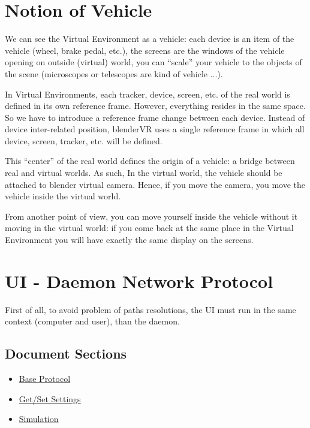 \documentclass[a4,10pt,openany,oneside]{sphinxmanual}
\begin{document}
\section{Notion of  Vehicle}
\label{architecture/vehicle:notion-of-vehicle}\label{architecture/vehicle::doc}
We can see the Virtual Environment as a vehicle: each device is an item of the vehicle (wheel, brake pedal, etc.), the screens are the windows of the vehicle opening on outside (virtual) world, you can ``scale'' your vehicle to the objects of the scene (microscopes or telescopes are kind of vehicle ...).

In Virtual Environments, each tracker, device, screen, etc. of the real world is defined in its own reference frame. However, everything resides in the same space. So we have to introduce a reference frame change between each device. Instead of device inter-related position, blenderVR uses a single reference frame in which all device, screen, tracker, etc. will be defined.

This ``center'' of the real world defines the origin of a vehicle: a bridge between real and virtual worlds.
As such, In the virtual world, the vehicle should be attached to blender virtual camera. Hence, if you move the camera, you move the vehicle inside the virtual world.

From another point of view, you can move yourself inside the vehicle without it moving in the virtual world: if you come back at the same place in the Virtual Environment you will have exactly the same display on the screens.


\section{UI - Daemon Network Protocol}
\label{architecture/protocols:ui-daemon-network-protocol}\label{architecture/protocols::doc}
First of all, to avoid problem of paths resolutions, the UI must run in the same context (computer and user), than the daemon.


\subsection{Document Sections}
\label{architecture/protocols:document-sections}\begin{itemize}
\item {} 
{\hyperref[architecture/protocols:base-protocol]{Base Protocol}}

\item {} 
{\hyperref[architecture/protocols:get-set-settings]{Get/Set Settings}}

\item {} 
{\hyperref[architecture/protocols:simulation]{Simulation}}

\end{itemize}
\end{document}
